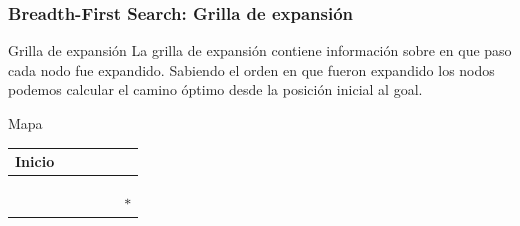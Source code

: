 \begin{frame}
    \frametitle{Breadth-First Search: Grilla de expansión}
    \begin{footnotesize}
        \begin{block}{Grilla de expansión}
            La grilla de expansión contiene información sobre en que paso cada nodo fue expandido.
            Sabiendo el orden en que fueron expandido los nodos podemos calcular el camino óptimo desde la posición inicial al goal.
        \end{block}
    
        \begin{center}
            Mapa\\
            \begin{tabularx}{6cm}{|X|X|X|X|X|X|}
                \hline
                Inicio &  & \cellcolor{black} & & & \\
                \hline
                & &  & &  & \\
                \hline
                & & \cellcolor{black} &  & \cellcolor{black} & \\
                \hline
                & & \cellcolor{black} &  & \cellcolor{black} & \\
                \hline
                & & \cellcolor{black} & & \cellcolor{black} & $*$\\
                \hline
            \end{tabularx}
        \end{center}


\end{footnotesize}
\end{frame}
